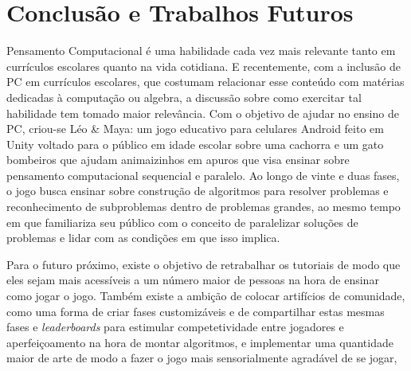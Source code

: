 \documentclass[conference]{IEEEtran}
\begin{document}
\section{Conclusão e Trabalhos Futuros}

Pensamento Computacional é uma habilidade cada vez mais relevante tanto em currículos escolares quanto na vida cotidiana. E recentemente, com a inclusão de PC em currículos escolares, que costumam relacionar esse conteúdo com matérias dedicadas à computação ou algebra, a discussão sobre como exercitar tal habilidade tem tomado maior relevância. Com o objetivo de ajudar no ensino de PC, criou-se Léo \& Maya: um jogo educativo para celulares Android feito em Unity voltado para o público em idade escolar sobre uma cachorra e um gato bombeiros que ajudam animaizinhos em apuros que visa ensinar sobre pensamento computacional sequencial e paralelo. Ao longo de vinte e duas fases, o jogo busca ensinar sobre construção de algoritmos para resolver problemas e reconhecimento de subproblemas dentro de problemas grandes, ao mesmo tempo em que familiariza seu público com o conceito de paralelizar soluções de problemas e lidar com as condições em que isso implica. 

Para o futuro próximo, existe o objetivo de retrabalhar os tutoriais de modo que eles sejam mais acessíveis a um número maior de pessoas na hora de ensinar como jogar o jogo. Também existe a ambição de colocar artifícios de comunidade, como uma forma de criar fases customizáveis e de compartilhar estas mesmas fases e \textit{leaderboards} para estimular competetividade entre jogadores e aperfeiçoamento na hora de montar algoritmos, e implementar uma quantidade maior de arte de modo a fazer o jogo mais sensorialmente agradável de se jogar,


%
\end{document}
